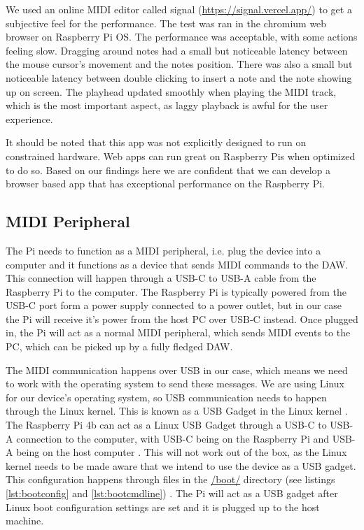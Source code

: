 We used an online MIDI editor called signal (\url{https://signal.vercel.app/}) to get a
subjective feel for the performance. The test was ran in the chromium web browser on
Raspberry Pi OS. The performance was acceptable, with some actions feeling slow.
Dragging around notes had a small but noticeable latency between the mouse cursor's
movement and the notes position. There was also a small but noticeable latency between
double clicking to insert a note and the note showing up on screen. The playhead updated
smoothly when playing the MIDI track, which is the most important aspect, as laggy
playback is awful for the user experience.

It should be noted that this app was not explicitly designed to run on constrained
hardware. Web apps can run great on Raspberry Pis when optimized to do so. Based on our
findings here we are confident that we can develop a browser based app that has
exceptional performance on the Raspberry Pi.

\subsection{MIDI Peripheral}
\label{sec:midi_peripheral}

The Pi needs to function as a MIDI peripheral, i.e. plug the device into a computer and it
functions as a device that sends MIDI commands to the DAW. This connection will happen
through a USB-C to USB-A cable from the Raspberry Pi to the computer. The Raspberry Pi is
typically powered from the USB-C port form a power supply connected to a power outlet, but
in our case the Pi will receive it's power from the host PC over USB-C instead. Once
plugged in, the Pi will act as a normal MIDI peripheral, which sends MIDI events to the
PC, which can be picked up by a fully fledged DAW.

The MIDI communication happens over USB in our case, which means we need to work with the
operating system to send these messages. We are using Linux for our device's operating
system, so USB communication needs to happen through the Linux kernel. This is known as a
USB Gadget in the Linux kernel \autocite{usbGadgetDocumentation}. The Raspberry Pi 4b can
act as a Linux USB Gadget through a USB-C to USB-A connection to the computer, with USB-C
being on the Raspberry Pi and USB-A being on the host computer
\autocite{raspberryPiGadgetSetup}. This will not work out of the box, as the Linux kernel
needs to be made aware that we intend to use the device as a USB gadget. This
configuration happens through files in the \url{/boot/} directory
(see listings \ref{lst:bootconfig} and
\ref{lst:bootcmdline}) \autocite{raspberryPiGadgetSetup}. The Pi will act as a USB
gadget after Linux boot configuration settings are set and it is plugged up to the host
machine.

